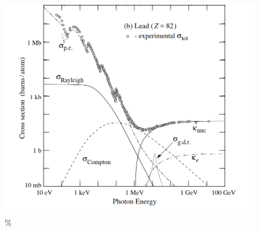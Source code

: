 \begin{figure}
    \centering
    \includegraphics[width = \linewidth]{content/Absorb.png}
    \caption{\% \cite{pdg}}
    \label{fig:sigma}
\end{figure}
